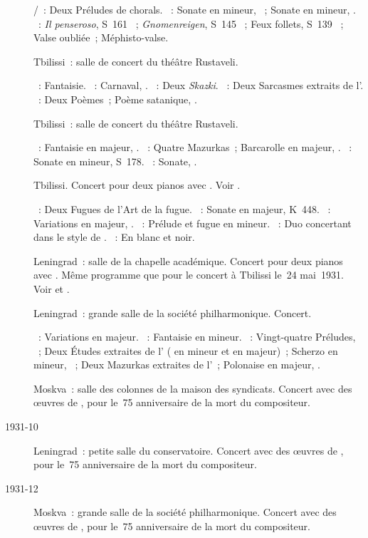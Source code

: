\begin{description}
 \textsc{\JBach{}/\Busoni{}}~: Deux Préludes de chorals.
 \textsc{\Beethoven{}}~: Sonate en \kC mineur, ~; Sonate en \kC
 \Sharp mineur,  .
 \textsc{\Liszt{}}~: \emph{Il penseroso}, S~161 ~;
 \emph{Gnomenreigen}, S~145 ~; Feux follets, S~139 ~;
 Valse oubliée~; Méphisto-valse.
 \item[\DateWithWeekDay{1931-05-21}]
 Tbilissi~: salle de concert du théâtre Rustaveli.

 \textsc{\Mozart{}}~: Fantaisie.
 \textsc{\Schumann{}}~: Carnaval, .
 \textsc{\Medtner{}}~: Deux \emph{Skazki}.
 \textsc{\Prokofiev{}}~: Deux Sarcasmes extraits de l'.
 \textsc{\Scriabine{}}~: Deux Poèmes~; Poème satanique, .
 \item[\DateWithWeekDay{1931-05-22}]
 Tbilissi~: salle de concert du théâtre Rustaveli.

 \textsc{\Schumann{}}~: Fantaisie en \kC majeur, .
 \textsc{\Chopin{}}~: Quatre Mazurkas~; Barcarolle en \kF \Sharp majeur,
 .
 \textsc{\Liszt{}}~: Sonate en \kB mineur, S~178.
 \textsc{\Scriabine{}}~: Sonate, .
 \item[\DateWithWeekDay{1931-05-24}]
 Tbilissi.
 Concert pour deux pianos avec \MYudina{}.
 Voir \citet{Yudina02}.

 \textsc{\JBach{}}~: Deux Fugues de l'\hbox{Art} de la fugue.
 \textsc{\Mozart{}}~: Sonate en \kD majeur, K~448.
 \textsc{\Schumann{}}~: Variations en \kB \Flat majeur, .
 \textsc{\Taneiev{}}~: Prélude et fugue en \kG \Sharp mineur.
 \textsc{\Busoni{}}~: Duo concertant dans le style de \Mozart{}.
 \textsc{\Debussy{}}~: En blanc et noir.
 \item[\DateWithWeekDay{1931-06-20}]
 Leningrad~: salle de la chapelle académique.
 Concert pour deux pianos avec \MYudina{}.
 Même programme que pour le concert à Tbilissi le~24 mai~1931.
 Voir \citet[p.~46 et note~4]{White} et \citet[p.~403]{Scriabine}.
 \item[\DateWithWeekDay{1931-10-08}]
 Leningrad~: grande salle de la société philharmonique.
 Concert.

 \textsc{\Haendel{}}~: Variations en \kE majeur.
 \textsc{\Mozart{}}~: Fantaisie en \kC mineur.
 \textsc{\Chopin{}}~: Vingt-quatre Préludes, ~; Deux Études
 extraites de l' ( en \kE \Flat mineur et  en
 \kG \Flat majeur)~; Scherzo  en \kC \Sharp mineur, ~;
 Deux Mazurkas extraites de l'~; Polonaise en \kA \Flat majeur,
 .
 \item[\DateWithWeekDay{1931-10-11}]
 Moskva~: salle des colonnes de la maison des syndicats.
 Concert avec des œuvres de \Schumann{}, pour le~75\ieme{} anniversaire de
 la mort du compositeur.
 \item[1931-10]
 Leningrad~: petite salle du conservatoire.
 Concert avec des œuvres de \Schumann{}, pour le~75\ieme{} anniversaire de
 la mort du compositeur.
 \item[1931-12]
 Moskva~: grande salle de la société philharmonique.
 Concert avec des œuvres de \Schumann{}, pour le~75\ieme{} anniversaire de
 la mort du compositeur.


\end{description}
